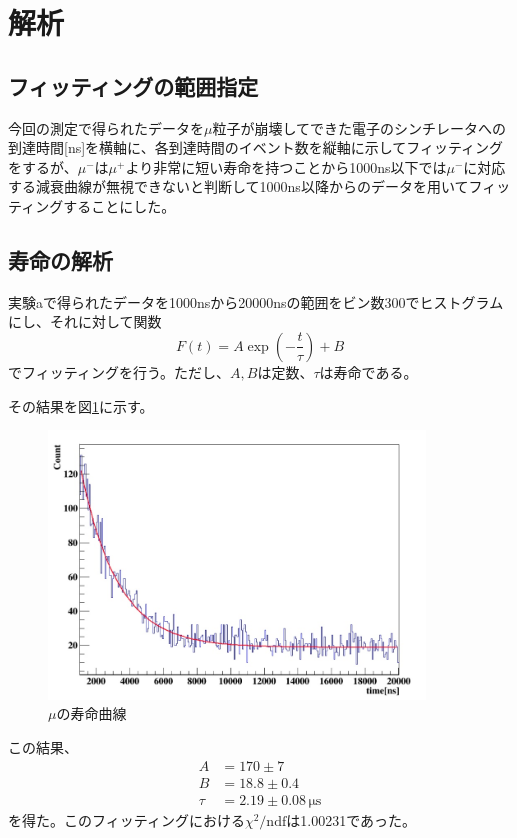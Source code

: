 \section{解析}
\subsection{フィッティングの範囲指定}
今回の測定で得られたデータを$\mu$粒子が崩壊してできた電子のシンチレータへの到達時間[ns]を‎横軸に、各到達時間のイベント数を縦軸に示してフィッティングをするが、$\mu^-$は$\mu^+$より非常に短い寿命を持つことから1000ns以下では$\mu^-$に対応する減衰曲線が無視できないと判断して1000ns以降からのデータを用いてフィッティングすることにした。

\subsection{寿命の解析}
実験aで得られたデータを1000nsから20000nsの範囲をビン数300でヒストグラムにし、それに対して関数
\begin{equation}
F(t)=A\exp\left(-\frac{t}{\tau}\right)+B
\end{equation}
でフィッティングを行う。ただし、$A,B$は定数、$\tau$は寿命である。

その結果を図\ref{mu_lifetime}に示す。
\begin{figure}[htbp]
  \centering
  \includegraphics[width=10cm,bb=0 0 919 656]{lifetime.jpg}
  \caption{$\mu$の寿命曲線}
  \label{mu_lifetime}
\end{figure}

この結果、
\begin{align*}
A &= 170 \pm 7  \\
B &= 18.8 \pm 0.4 \\
\tau &= 2.19 \pm 0.08\,\mathrm{\mu s}
\end{align*}
を得た。このフィッティングにおける$\chi^2/\mathrm{ndf}$は1.00231であった。

